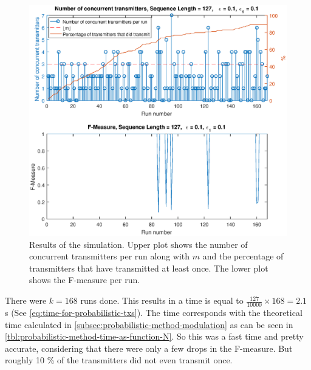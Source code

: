 \begin{figure}[tbp]
	\centering
	\includegraphics[width=\textwidth]{chapters/evaluation-chapters/simulation/sim-concurrent-tx-and-f-measure-eps=1-n=7.eps}
	\caption{Results of the simulation. Upper plot shows the number of concurrent transmitters per run along with $m$ and the percentage of transmitters that have transmitted at least once. The lower plot shows the F-measure per run.}
	\label{fig:sim-concurrent-tx-and-f-measure-eps=1-n=7}
\end{figure}








There were $k = 168$ runs done.
This results in a time is equal to $\frac{127}{10000} \times 168 = 2.1$ s (See \autoref{eq:time-for-probabilistic-txs}).
The time corresponds with the theoretical time calculated in \autoref{subsec:probabilistic-method-modulation} as can be seen in \autoref{tbl:probabilistic-method-time-as-function-N}.
So this was a fast time and pretty accurate, considering that there were only a few drops in the F-measure.
But roughly 10 \% of the transmitters did not even transmit once.











